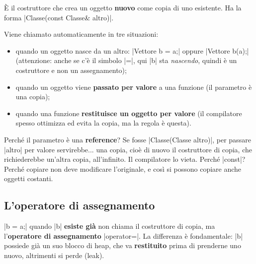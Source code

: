 \begin{definizione}
È il costruttore che crea un oggetto \textbf{nuovo} come copia di uno esistente.
Ha la forma \cc|Classe(const Classe& altro)|.
\end{definizione}
Viene chiamato automaticamente in tre situazioni:
\begin{itemize}
  \item quando un oggetto nasce da un altro: \cc|Vettore b = a;| oppure \cc|Vettore b(a);|
        (attenzione: anche se c'è il simbolo \cc|=|, qui \cc|b| sta \emph{nascendo},
        quindi è un costruttore e non un assegnamento);
  \item quando un oggetto viene \textbf{passato per valore} a una funzione (il
        parametro è una copia);
  \item quando una funzione \textbf{restituisce un oggetto per valore} (il
        compilatore spesso ottimizza ed evita la copia, ma la regola è questa).
\end{itemize}
Perché il parametro è una \textbf{reference}? Se fosse \cc|Classe(Classe altro)|,
per passare \cc|altro| per valore servirebbe... una copia, cioè di nuovo il
costruttore di copia, che richiederebbe un'altra copia, all'infinito. Il
compilatore lo vieta. Perché \cc|const|? Perché copiare non deve modificare
l'originale, e così si possono copiare anche oggetti costanti.

\subsection*{L'operatore di assegnamento}

\cc|b = a;| quando \cc|b| \textbf{esiste già} non chiama il costruttore di copia,
ma l'\textbf{operatore di assegnamento} \cc|operator=|. La differenza è
fondamentale: \cc|b| possiede già un suo blocco di heap, che va
\textbf{restituito} prima di prenderne uno nuovo, altrimenti si perde (leak).

